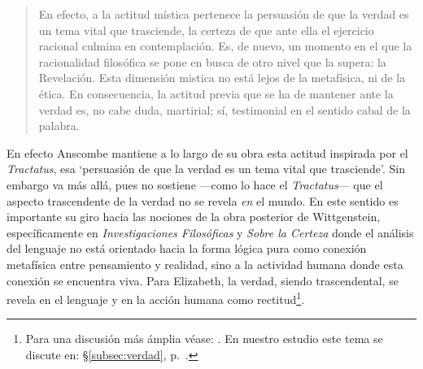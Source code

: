 \blockquote[{\Cite[357]{dominguez2009at}}]{En efecto, a la actitud mística pertenece la persuasión de que la verdad es un tema vital que trasciende, la certeza de que ante ella el ejercicio racional culmina en contemplación. Es, de nuevo, un momento en el que la racionalidad filosófica se pone en busca de otro nivel que la supera: la Revelación. Esta dimensión mistica no está lejos de la metafísica, ni de la ética. \textelp{} En consecuencia, la actitud previa que se ha de mantener ante la verdad es, no cabe duda, martirial; sí, testimonial en el sentido cabal de la palabra.}

En efecto Anscombe mantiene a lo largo de su obra esta actitud inspirada por el \emph{Tractatus}, esa \enquote*{persuasión de que la verdad es un tema vital que trasciende}. Sin embargo va más allá, pues no sostiene ---como lo hace el \emph{Tractatus}--- que el aspecto trascendente de la verdad no se revela \emph{en} el mundo. En este sentido es importante su giro hacia las nociones de la obra posterior de Wittgenstein, específicamente en \emph{Investigaciones Filosóficas} y \emph{Sobre la Certeza} donde el análisis del lenguaje no está orientado hacia la forma lógica pura como conexión metafísica entre pensamiento y realidad, sino a la actividad humana donde esta conexión se encuentra viva. Para Elizabeth, la verdad, siendo trascendental, se revela en el lenguaje y en la acción humana como rectitud\footnote{Para una discusión más ámplia véase: \Cite{torralbaynubiola2005fayeh:unidadverdad}. En nuestro estudio este tema se discute en: \S\ref{subsec:verdad}, p.~\pageref{subsec:verdad}.}.

